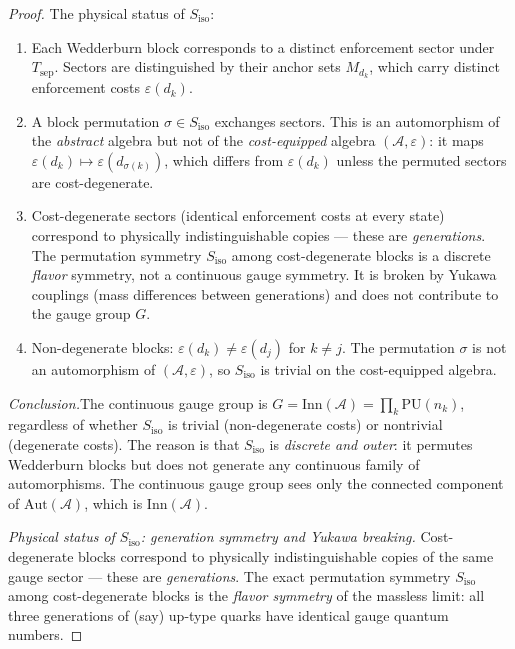\documentclass[11pt,a4paper]{article}
\theoremstyle{definition}
\newcommand{\eps}{\varepsilon}
\begin{document}
\begin{proof}
The physical status of $S_{\mathrm{iso}}$:
\begin{enumerate}[label=(\alph*),nosep]
  \item Each Wedderburn block corresponds to a distinct enforcement sector
  under $T_{\mathrm{sep}}$.  Sectors are distinguished by their anchor sets
  $M_{d_k}$, which carry distinct enforcement costs $\eps(d_k)$.
  \item A block permutation $\sigma \in S_{\mathrm{iso}}$ exchanges sectors.
  This is an automorphism of the \emph{abstract} algebra but not of the
  \emph{cost-equipped} algebra $(\mathcal{A}, \eps)$: it maps
  $\eps(d_k) \mapsto \eps(d_{\sigma(k)})$, which differs from $\eps(d_k)$
  unless the permuted sectors are cost-degenerate.
  \item Cost-degenerate sectors (identical enforcement costs at every state)
  correspond to physically indistinguishable copies --- these are
  \emph{generations}.  The permutation symmetry $S_{\mathrm{iso}}$ among
  cost-degenerate blocks is a discrete \emph{flavor} symmetry, not a
  continuous gauge symmetry.  It is broken by Yukawa couplings (mass
  differences between generations) and does not contribute to the gauge
  group $G$.
  \item Non-degenerate blocks: $\eps(d_k) \ne \eps(d_j)$ for $k \ne j$.
  The permutation $\sigma$ is not an automorphism of $(\mathcal{A}, \eps)$,
  so $S_{\mathrm{iso}}$ is trivial on the cost-equipped algebra.
\end{enumerate}

\noindent\textit{Conclusion.}\quad The continuous gauge group is
$G = \mathrm{Inn}(\mathcal{A}) = \prod_k \mathrm{PU}(n_k)$,
regardless of whether $S_{\mathrm{iso}}$ is trivial (non-degenerate
costs) or nontrivial (degenerate costs).  The reason is that
$S_{\mathrm{iso}}$ is \emph{discrete and outer}: it permutes
Wedderburn blocks but does not generate any continuous family of
automorphisms.  The continuous gauge group sees only the connected
component of $\mathrm{Aut}(\mathcal{A})$, which is
$\mathrm{Inn}(\mathcal{A})$.

\smallskip\noindent\textit{Physical status of $S_{\mathrm{iso}}$:
generation symmetry and Yukawa breaking.}\quad
Cost-degenerate blocks correspond to physically indistinguishable
copies of the same gauge sector --- these are \emph{generations}.
The exact permutation symmetry $S_{\mathrm{iso}}$ among
cost-degenerate blocks is the \emph{flavor symmetry} of the massless
limit: all three generations of (say) up-type quarks have identical
gauge quantum numbers.


\end{proof}
\end{document}
